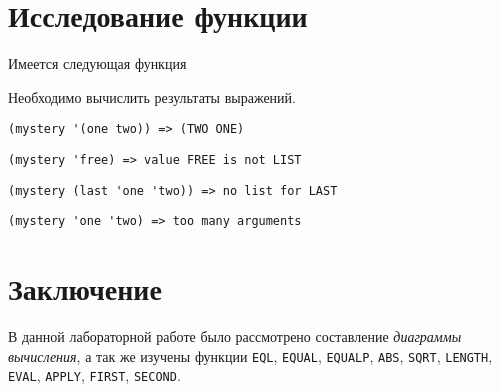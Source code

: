 \section{Исследование функции}

Имеется следующая функция


\noindent
Необходимо вычислить результаты выражений.


\problem \hfill
\begin{lstlisting}
(mystery '(one two)) => (TWO ONE)
\end{lstlisting}


\problem \hfill
\begin{lstlisting}
(mystery 'free) => value FREE is not LIST
\end{lstlisting}


\problem \hfill
\begin{lstlisting}
(mystery (last 'one 'two)) => no list for LAST
\end{lstlisting}


\problem \hfill
\begin{lstlisting}
(mystery 'one 'two) => too many arguments
\end{lstlisting}



\section{Заключение}

В данной лабораторной работе было рассмотрено составление \textit{диаграммы вычисления}, а так же изучены функции \verb|EQL|, \verb|EQUAL|, \verb|EQUALP|, \verb|ABS|, \verb|SQRT|, \verb|LENGTH|, \verb|EVAL|, \verb|APPLY|, \verb|FIRST|, \verb|SECOND|.
